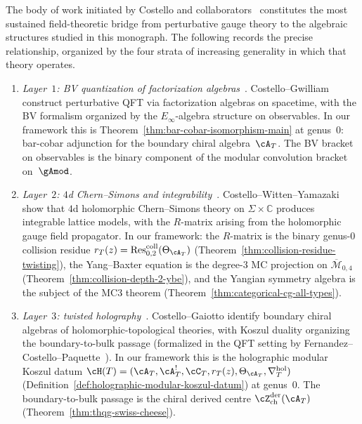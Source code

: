 The body of work initiated by Costello and
collaborators~\cite{CG17,CWY18,CostelloGaiotto2020,CL16,Costello2111,CostelloP2201,Costello2302,CPS2208,CPS2306,FernandezCostelloP24,BittlestonCostelloZeng24,RSW23,CFG25}
constitutes the most sustained field-theoretic bridge from perturbative
gauge theory to the algebraic structures studied in this monograph.
The following records the precise relationship, organized by the four
strata of increasing generality in which that theory operates.

\begin{remark}
\label{rem:costello-four-layers}

\begin{enumerate}[label=\textup{(\roman*)}]
\item \emph{Layer~$1$: BV quantization of factorization
 algebras}~\cite{CG17}.
 Costello--Gwilliam construct perturbative QFT
 via factorization algebras on spacetime, with the BV formalism
 organized by the $E_\infty$-algebra structure on observables.
 In our framework this is
 Theorem~\ref{thm:bar-cobar-isomorphism-main} at genus~$0$:
 bar-cobar adjunction for the boundary chiral algebra~$\cA_T$.
 The BV bracket on observables is the binary component of the
 modular convolution bracket on~$\gAmod$.

\item \emph{Layer~$2$: $4$d Chern--Simons and
 integrability}~\cite{CWY18}.
 Costello--Witten--Yamazaki show that $4$d holomorphic
 Chern--Simons theory on $\Sigma \times \mathbb{C}$ produces
 integrable lattice models, with the $R$-matrix arising from
 the holomorphic gauge field propagator. In our framework:
 the $R$-matrix is the binary genus-$0$ collision residue
 $r_T(z) = \operatorname{Res}^{\mathrm{coll}}_{0,2}(\Theta_{\cA_T})$
 (Theorem~\ref{thm:collision-residue-twisting}), the Yang--Baxter
 equation is the degree-$3$ MC projection on
 $\overline{\mathcal{M}}_{0,4}$
 (Theorem~\ref{thm:collision-depth-2-ybe}),
 and the Yangian symmetry algebra is the subject of the
 MC3 theorem
 (Theorem~\ref{thm:categorical-cg-all-types}).

\item \emph{Layer~$3$: twisted
 holography}~\cite{CostelloGaiotto2020,Costello-1705.02500v1,FernandezCostelloP24}.
 Costello--Gaiotto identify boundary chiral algebras of
 holomorphic-topological theories, with Koszul duality
 organizing the boundary-to-bulk passage
 (formalized in the QFT setting
 by Fernandez--Costello--Paquette~\cite{FernandezCostelloP24}). In our framework
 this is the holographic modular Koszul datum
 $\cH(T) = (\cA_T, \cA_T^!, \cC_T, r_T(z),
 \Theta_{\cA_T}, \nabla^{\mathrm{hol}}_T)$
 (Definition~\ref{def:holographic-modular-koszul-datum})
 at genus~$0$. The boundary-to-bulk passage
 is the chiral derived centre
 $\cZ^{\mathrm{der}}_{\mathrm{ch}}(\cA_T)$
 (Theorem~\ref{thm:thqg-swiss-cheese}).


\end{enumerate}
\end{remark}
